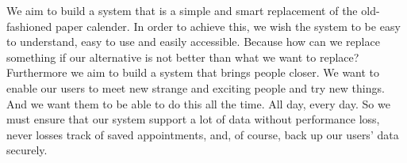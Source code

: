 We aim to build a system that is a simple and smart replacement of the old-fashioned paper calender. In order to achieve this, we wish the system to be easy to understand, easy to use and easily accessible. Because how can we replace something if our alternative is not better than what we want to replace? \\
Furthermore we aim to build a system that brings people closer. We want to enable our users to meet new strange and exciting people and try new things. And we want them to be able to do this all the time. All day, every day. So we must ensure that our system support a lot of data without performance loss, never losses track of saved appointments, and, of course, back up our users' data securely.